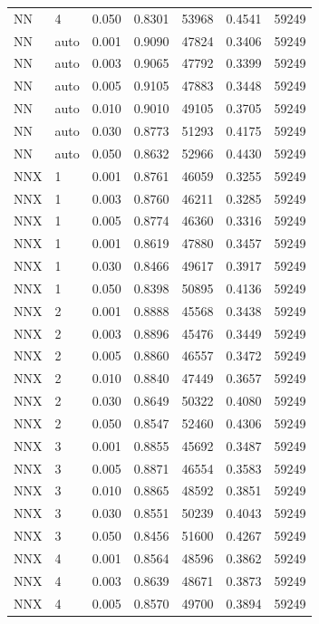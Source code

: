 \documentclass{article}
\begin{document}
\begin{longtable}[htbp]{l|l|l|*{4}{c}}
      NN & 4 & 0.050 & 0.8301 & 53968 & 0.4541 & 59249\\
      NN & auto & 0.001 & 0.9090 & 47824 & 0.3406 & 59249\\
      NN & auto & 0.003 & 0.9065 & 47792 & 0.3399 & 59249\\
      NN & auto & 0.005 & 0.9105 & 47883 & 0.3448 & 59249\\
      NN & auto & 0.010 & 0.9010 & 49105 & 0.3705 & 59249\\
      NN & auto & 0.030 & 0.8773 & 51293 & 0.4175 & 59249\\
      NN & auto & 0.050 & 0.8632 & 52966 & 0.4430 & 59249\\
      NNX & 1 & 0.001 & 0.8761 & 46059 & 0.3255 & 59249\\
      NNX & 1 & 0.003 & 0.8760 & 46211 & 0.3285 & 59249\\
      NNX & 1 & 0.005 & 0.8774 & 46360 & 0.3316 & 59249\\
      NNX & 1 & 0.001 & 0.8619 & 47880 & 0.3457 & 59249\\
      NNX & 1 & 0.030 & 0.8466 & 49617 & 0.3917 & 59249\\
      NNX & 1 & 0.050 & 0.8398 & 50895 & 0.4136 & 59249\\
      NNX & 2 & 0.001 & 0.8888 & 45568 & 0.3438 & 59249\\
      NNX & 2 & 0.003 & 0.8896 & 45476 & 0.3449 & 59249\\
      NNX & 2 & 0.005 & 0.8860 & 46557 & 0.3472 & 59249\\
      NNX & 2 & 0.010 & 0.8840 & 47449 & 0.3657 & 59249\\
      NNX & 2 & 0.030 & 0.8649 & 50322 & 0.4080 & 59249\\
      NNX & 2 & 0.050 & 0.8547 & 52460 & 0.4306 & 59249\\
      NNX & 3 & 0.001 & 0.8855 & 45692 & 0.3487 & 59249\\
      NNX & 3 & 0.005 & 0.8871 & 46554 & 0.3583 & 59249\\
      NNX & 3 & 0.010 & 0.8865 & 48592 & 0.3851 & 59249\\
      NNX & 3 & 0.030 & 0.8551 & 50239 & 0.4043 & 59249\\
      NNX & 3 & 0.050 & 0.8456 & 51600 & 0.4267 & 59249\\
      NNX & 4 & 0.001 & 0.8564 & 48596 & 0.3862 & 59249\\
      NNX & 4 & 0.003 & 0.8639 & 48671 & 0.3873 & 59249\\
      NNX & 4 & 0.005 & 0.8570 & 49700 & 0.3894 & 59249\\

\end{longtable}
\end{document}
